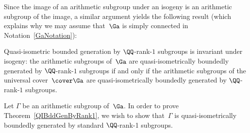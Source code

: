 Since the image of an arithmetic subgroup under an isogeny is an arithmetic subgroup of the image, a similar argument yields the following result (which explains why we may assume that~$\Ga$ is simply connected in Notation~\ref{GaNotation}):

\begin{lem} \label{InvtUnderIsogeny}
Quasi-isometric bounded generation by $\QQ$-rank-$1$ subgroups is invariant under isogeny:
the arithmetic subgroups of~$\Ga$ are quasi-isometrically boundedly generated by $\QQ$-rank-$1$ subgroups if and only if the arithmetic subgroups of the universal cover~$\cover\Ga$ are quasi-isometrically boundedly generated by $\QQ$-rank-$1$ subgroups.
\end{lem}

Let $\Gamma$ be an arithmetic subgroup of~$\Ga$. In order to prove Theorem~\ref{QIBddGenByRank1}, we wish to show that~$\Gamma$ is quasi-isometrically boundedly generated by standard $\QQ$-rank-1 subgroups.

